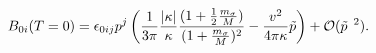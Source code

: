 \begin{equation}\label{eq.03}
B_{0i}(T=0)= \epsilon_{0ij} p^j \left( \frac{1}{3 \pi}
\frac{|\kappa|}{\kappa} \frac{(1 + \frac{1}{2}
\frac{m_{\sigma}}{M})}{(1 + \frac{m_{\sigma}}{M})^2} - \frac{v^2}{4
\pi \kappa } \tilde p  \right) + {\cal{O}}(\tilde{p}^{\phantom a 2}).
\end{equation}

